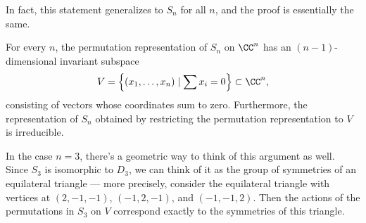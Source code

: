     



In fact, this statement generalizes to $S_n$ for all $n$, and the proof is essentially the same. 

\begin{proposition}
For every $n$, the permutation representation of $S_n$ on $\CC^n$ has an $(n - 1)$-dimensional invariant subspace \[V = \left\{(x_1, \ldots, x_n) \mid \sum x_i = 0\right\} \subset \CC^n,\] consisting of vectors whose coordinates sum to zero. Furthermore, the representation of $S_n$ obtained by restricting the permutation representation to $V$ is irreducible. 
\end{proposition}

In the case $n = 3$, there's a geometric way to think of this argument as well. Since $S_3$ is isomorphic to $D_3$, we can think of it as the group of symmetries of an equilateral triangle --- more precisely, consider the equilateral triangle with vertices at $(2, -1, -1)$, $(-1, 2, -1)$, and $(-1, -1, 2)$. Then the actions of the permutations in $S_3$ on $V$ correspond exactly to the symmetries of this triangle.

